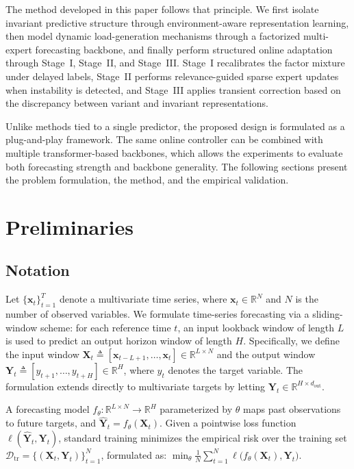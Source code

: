 ﻿\documentclass[journal]{IEEEtran}
\begin{document}
The method developed in this paper follows that principle. We first isolate invariant predictive structure through environment-aware representation learning, then model dynamic load-generation mechanisms through a factorized multi-expert forecasting backbone, and finally perform structured online adaptation through Stage~I, Stage~II, and Stage~III. Stage~I recalibrates the factor mixture under delayed labels, Stage~II performs relevance-guided sparse expert updates when instability is detected, and Stage~III applies transient correction based on the discrepancy between variant and invariant representations.

Unlike methods tied to a single predictor, the proposed design is formulated as a plug-and-play framework. The same online controller can be combined with multiple transformer-based backbones, which allows the experiments to evaluate both forecasting strength and backbone generality. The following sections present the problem formulation, the method, and the empirical validation.

\section{Preliminaries}
\subsection{Notation}
Let $\{\mathbf{x}_t\}_{t=1}^{T}$ denote a multivariate time series, where $\mathbf{x}_t \in \mathbb{R}^{N}$ and $N$ is the number of observed variables. We formulate time-series forecasting via a sliding-window scheme: for each reference time $t$, an input lookback window of length $L$ is used to predict an output horizon window of length $H$. Specifically, we define the input window $\mathbf{X}_t \triangleq [\mathbf{x}_{t-L+1},\ldots,\mathbf{x}_t] \in \mathbb{R}^{L \times N}$ and the output window $\mathbf{Y}_t \triangleq [y_{t+1},\ldots,y_{t+H}] \in \mathbb{R}^{H}$, where $y_t$ denotes the target variable. The formulation extends directly to multivariate targets by letting $\mathbf{Y}_t \in \mathbb{R}^{H \times d_{\mathrm{out}}}$.

A forecasting model $f_{\theta}: \mathbb{R}^{L \times N} \rightarrow \mathbb{R}^{H}$ parameterized by $\theta$ maps past observations to future targets, and $\widehat{\mathbf{Y}}_t = f_{\theta}(\mathbf{X}_t)$. Given a pointwise loss function $\ell(\widehat{\mathbf{Y}}_t,\mathbf{Y}_t)$, standard training minimizes the empirical risk over the training set $\mathcal{D}_{\mathrm{tr}}=\{(\mathbf{X}_t,\mathbf{Y}_t)\}_{t=1}^{N}$, formulated as:  $\min_{\theta}\frac{1}{N}\sum_{t=1}^{N}\ell\big(f_{\theta}(\mathbf{X}_t),\mathbf{Y}_t\big)$.
\end{document}
